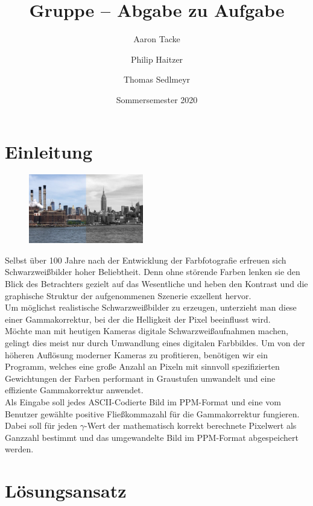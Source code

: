\documentclass[course=erap]{aspdoc}
\author{Aaron Tacke \and Philip Haitzer \and Thomas Sedlmeyr}
\date{Sommersemester 2020} %
\title{Gruppe \theGroup{} -- Abgabe zu Aufgabe \theNumber}
\begin{document}
	\maketitle
	
	\section{Einleitung}
	
	\begin{figure}
		\includegraphics[width=5cm]{Images/gammaBeispiel.jpg}
	\end{figure}
	Selbst über 100 Jahre nach der Entwicklung der Farbfotografie erfreuen sich Schwarzweißbilder hoher Beliebtheit. Denn ohne störende Farben lenken sie den Blick des Betrachters gezielt auf das Wesentliche und heben den Kontrast und die graphische Struktur der aufgenommenen Szenerie exzellent hervor.\\
	Um möglichst realistische Schwarzweißbilder zu erzeugen, unterzieht man diese einer Gammakorrektur, bei der die Helligkeit der Pixel beeinflusst wird.\\
	
	\noindent Möchte man mit heutigen Kameras digitale Schwarzweißaufnahmen machen, gelingt dies meist nur durch Umwandlung eines digitalen Farbbildes. Um von der höheren Auflösung moderner Kameras zu profitieren, benötigen wir ein Programm, welches eine große Anzahl an Pixeln mit sinnvoll spezifizierten Gewichtungen der Farben performant in Graustufen umwandelt und eine effiziente Gammakorrektur anwendet.\\
	
	\noindent Als Eingabe soll jedes ASCII-Codierte Bild im PPM-Format und eine vom Benutzer gewählte positive Fließkommazahl für die Gammakorrektur fungieren. Dabei soll für jeden $\gamma$-Wert der mathematisch korrekt berechnete Pixelwert als Ganzzahl bestimmt und das umgewandelte Bild im PPM-Format abgespeichert werden.
	
	
	\section{Lösungsansatz}
\end{document}
